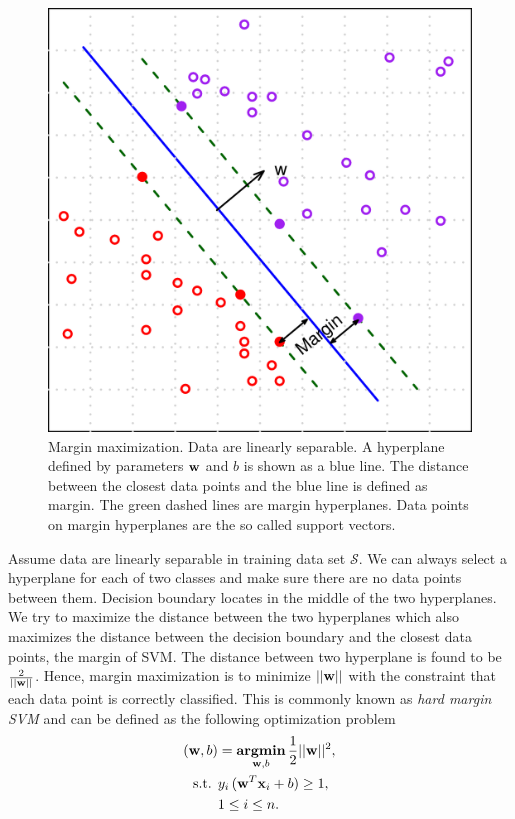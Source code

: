 \documentclass[english]{tktltiki}
\newcommand{\Scal}{\mathcal{S}}
\newcommand{\argmin}{\textbf{argmin}}
\newcommand{\xb}{{\bf x}}
\newcommand{\wb}{{\bf w}}
\begin{document}
\begin{figure}[t]
\begin{center}
\centering
\includegraphics[width=0.60\columnwidth]{./plots/margin_maximization.pdf}
\caption[Margin maximization.]{Margin maximization. Data are linearly separable. A hyperplane defined by parameters $\wb$ and $b$ is shown as a blue line. The distance between the closest data points and the blue line is defined as margin. The green dashed lines are margin hyperplanes. Data points on margin hyperplanes are the so called support vectors.}
\label{margin_maximization}
\end{center}
\end{figure}


Assume data are linearly separable in training data set $\Scal$. We can always select a hyperplane for each of two classes and make sure there are no data points between them. Decision boundary locates in the middle of the two hyperplanes. We try to maximize the distance between the two hyperplanes which also maximizes the distance between the decision boundary and the closest data points, the {margin} of SVM. The distance between two hyperplane is found to be $\frac{2}{||\wb||}$. Hence, {margin maximization} is to minimize $||\wb||$ with the constraint that each data point is correctly classified. This is commonly known as {\em hard margin SVM} and can be defined as the following optimization problem
\begin{align}
(\wb,b) & = \underset{\wb,b}{\operatorname{\argmin}} \, \frac{1}{2} ||\wb||^2,
\label{hard_margin_def} \\
\text{ s.t. } & y_i\,(\wb^T\xb_i + b) \ge 1,
\label{hard_margin_constraint} \\
 & 1 \leq i \leq n. \nonumber
\end{align}
\end{document}
